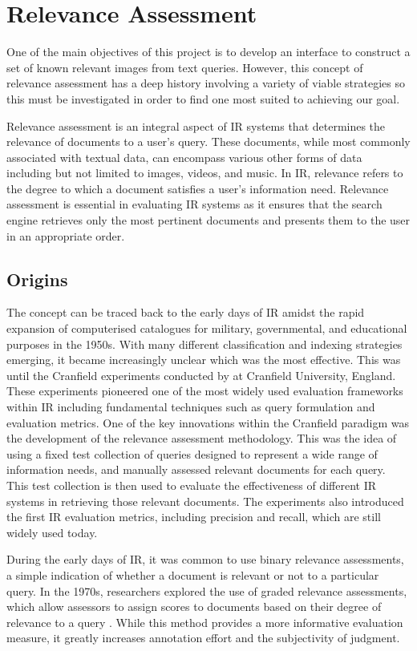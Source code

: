 \documentclass{l4proj}
\begin{document}
\section{Relevance Assessment}
One of the main objectives of this project is to develop an interface to construct a set of known relevant images from text queries. However, this concept of relevance assessment has a deep history involving a variety of viable strategies so this must be investigated in order to find one most suited to achieving our goal.

Relevance assessment is an integral aspect of IR systems that determines the relevance of documents to a user's query. These documents, while most commonly associated with textual data, can encompass various other forms of data including but not limited to images, videos, and music. In IR, relevance refers to the degree to which a document satisfies a user's information need. Relevance assessment is essential in evaluating IR systems as it ensures that the search engine retrieves only the most pertinent documents and presents them to the user in an appropriate order.

\subsection{Origins}
The concept can be traced back to the early days of IR amidst the rapid expansion of computerised catalogues for military, governmental, and educational purposes in the 1950s. With many different classification and indexing strategies emerging, it became increasingly unclear which was the most effective. This was until the Cranfield experiments conducted by \cite{cleverdon1967cranfield} at Cranfield University, England. These experiments pioneered one of the most widely used evaluation frameworks within IR including fundamental techniques such as query formulation and evaluation metrics. One of the key innovations within the Cranfield paradigm was the development of the relevance assessment methodology. This was the idea of using a fixed test collection of queries designed to represent a wide range of information needs, and manually assessed relevant documents for each query. This test collection is then used to evaluate the effectiveness of different IR systems in retrieving those relevant documents. The experiments also introduced the first IR evaluation metrics, including precision and recall, which are still widely used today. 

During the early days of IR, it was common to use binary relevance assessments, a simple indication of whether a document is relevant or not to a particular query. In the 1970s, researchers explored the use of graded relevance assessments, which allow assessors to assign scores to documents based on their degree of relevance to a query \citep{salton1971smart, robertson1976relvance}. While this method provides a more informative evaluation measure, it greatly increases annotation effort and the subjectivity of judgment.
\end{document}
